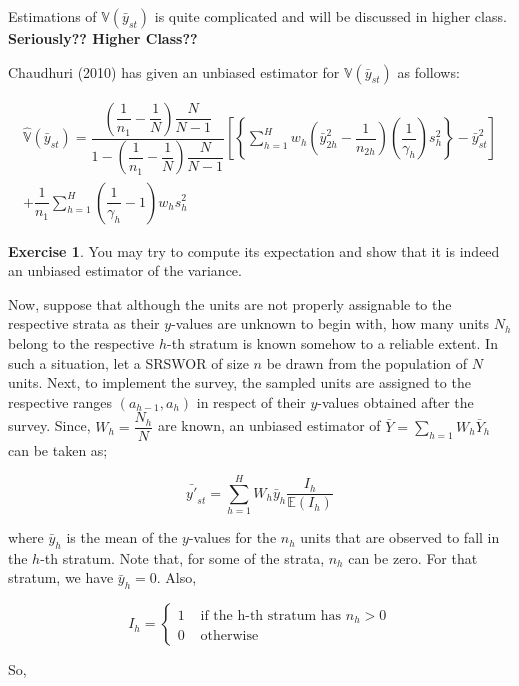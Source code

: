\documentclass[12pt]{article}
\newcommand{\E}{\mathbb{E}}
\newcommand{\Var}{\mathbb{V}}
\theoremstyle{definition}
\newtheorem{ex}{Exercise}
\newenvironment{note}{
\begin{tcolorbox}[colback=blue!5!white,colframe=blue!75!black,title=Note, parbox = false] }{\end{tcolorbox} }
\newenvironment{exercise}{
\begin{tcolorbox}[colback=red!5!white,colframe=red!75!black, parbox = false]\begin{ex} }{\end{ex}\end{tcolorbox} }
\begin{document}
\begin{note}
Estimations of $\Var(\bar{y}_{st})$ is quite complicated and will be discussed in higher class. \textbf{Seriously?? Higher Class??}

Chaudhuri (2010) has given an unbiased estimator for $\Var(\bar{y}_{st})$ as follows:

\begin{multline*}
    \hat{\Var}(\bar{y}_{st}) = \dfrac{ \left( \dfrac{1}{n_1} - \dfrac{1}{N} \right) \dfrac{N}{N-1} }{1 - \left( \dfrac{1}{n_1} - \dfrac{1}{N} \right) \dfrac{N}{N-1}} \left[
    \left\{
    \sum_{h = 1}^{H} w_h \left( \bar{y}_{2h}^2 - \dfrac{1}{n_{2h}} \right)\left( \dfrac{1}{\gamma_h} \right)s_h^2 \right\} - \bar{y}_{st}^2 \right]\\
    + \dfrac{1}{n_1} \sum_{h = 1}^{H} \left( \dfrac{1}{\gamma_h} - 1 \right)w_h s_h^2
\end{multline*}

\begin{exercise}
You may try to compute its expectation and show that it is indeed an unbiased estimator of the variance.
\end{exercise}
\end{note}

Now, suppose that although the units are not properly assignable to the respective strata as their $y$-values are unknown to begin with, how many units $N_h$ belong to the respective $h$-th stratum is known somehow to a reliable extent. In such a situation, let a SRSWOR of size $n$ be drawn from the population of $N$ units. Next, to implement the survey, the sampled units are assigned to the respective ranges $(a_{h-1}, a_h)$ in respect of their $y$-values obtained after the survey. Since, $W_h = \dfrac{N_h}{N}$ are known, an unbiased estimator of $\bar{Y} = \sum_{h = 1}W_h \bar{Y}_h$ can be taken as;

$$\bar{y'}_{st} = \sum_{h = 1}^{H} W_h \bar{y}_h \dfrac{I_h}{\E(I_h)}$$

where $\bar{y}_h$ is the mean of the $y$-values for the $n_h$ units that are observed to fall in the $h$-th stratum. Note that, for some of the strata, $n_h$ can be zero. For that stratum, we have $\bar{y}_h = 0$. Also, 

$$I_h = \begin{cases}
1 & \text{ if the h-th stratum has } n_h > 0\\
0 & \text{ otherwise}
\end{cases}$$

So, 
\end{document}
